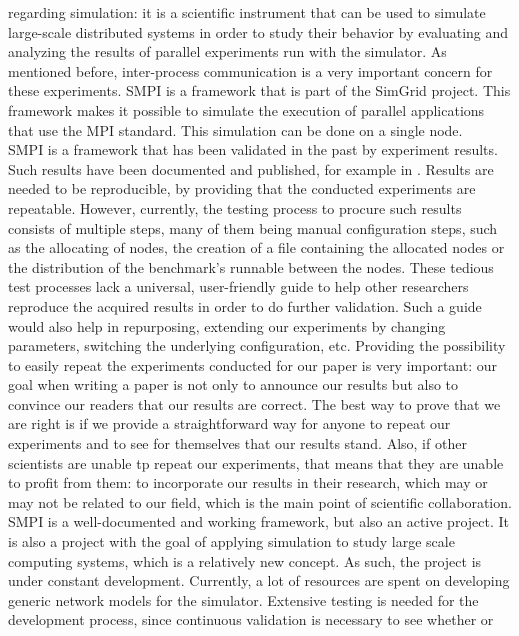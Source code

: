 regarding simulation: it is a scientific instrument that can be
used to simulate large-scale distributed systems in order to study
their behavior by evaluating and analyzing the results of parallel
experiments run with the simulator. As mentioned before, inter-process
communication is a very important concern for these experiments. SMPI
is a framework that is part of the SimGrid project. This framework
makes it possible to simulate the execution of parallel applications
that use the MPI standard. This simulation can be done on a single
node.\\
SMPI is a framework that has been validated in the past by experiment
results. Such results have been documented and published, for example
in \cite{csgscq11}. Results are needed to be reproducible, by
providing that the conducted experiments are repeatable. However,
currently, the testing process to procure such results
consists of multiple steps, many of them being manual configuration
steps, such as the allocating of nodes, the creation of a file
containing the allocated nodes or the distribution of the benchmark's
runnable between the nodes. These tedious test processes lack a
universal, user-friendly guide to help other researchers reproduce the
acquired results in order to do further validation. Such a guide would
also help in repurposing, extending our experiments by changing
parameters, switching the underlying configuration, etc. Providing the
possibility to easily repeat the experiments conducted for our paper
is very important: our goal when writing a paper is not only to
announce our results but also to convince our readers that our results
are correct.\cite{m10} The best way to prove that we are right is if
we provide a straightforward way for anyone to repeat our experiments
and to see for themselves that our results stand. Also, if other
scientists are unable tp repeat our experiments, that means that they
are unable to profit from them: to incorporate our results in their
research, which may or may not be related to our field, which is the
main point of scientific collaboration.\\
SMPI is a well-documented and working framework, but also an active
project. It is also a project with the goal of applying simulation to
study large scale computing systems, which is a relatively new
concept. As such, the project is under constant
development. Currently, a lot of resources are spent on developing
generic network models for
the simulator. Extensive testing is needed for the development
process, since continuous validation is necessary to see whether or
